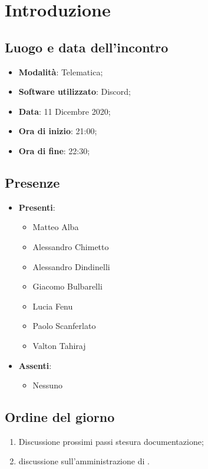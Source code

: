 \documentclass[]{article}
\begin{document}
	

	\newpage


	\section{Introduzione}
		\subsection{Luogo e data dell'incontro}
		\begin{itemize}
			\item \textbf{Modalità}: Telematica;
			\item \textbf{Software utilizzato}: Discord;
			\item \textbf{Data}: 11 Dicembre 2020;
			\item \textbf{Ora di inizio}: 21:00;
			\item \textbf{Ora di fine}: 22:30;
		\end{itemize}

		\subsection{Presenze}
		\begin{itemize}
			\item \textbf{Presenti}:
			\begin{itemize}
				\item Matteo Alba
				\item Alessandro Chimetto
				\item Alessandro Dindinelli
				\item Giacomo Bulbarelli
				\item Lucia Fenu
				\item Paolo Scanferlato
				\item Valton Tahiraj
			\end{itemize}
			\item \textbf{Assenti}:
			\begin{itemize}
				\item Nessuno
			\end{itemize}
		\end{itemize}


		\subsection{Ordine del giorno}
		\begin{enumerate}
			\item Discussione prossimi passi stesura documentazione;
			\item discussione sull'amministrazione di .
		\end{enumerate}
\end{document}
